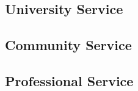 \documentclass[
  11pt,
  letterpaper,
  DIV=11,
  numbers=noendperiod]{scrartcl}
\begin{document}
\hypertarget{university-service}{%
\subsection{University Service}\label{university-service}}

\hypertarget{community-service}{%
\subsection{Community Service}\label{community-service}}

\hypertarget{professional-service}{%
\subsection{Professional Service}\label{professional-service}}
\end{document}

